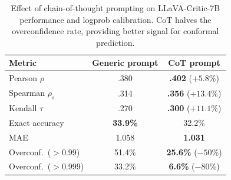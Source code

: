 \documentclass{article}
\begin{document}
\begin{table}[t]
\centering
\caption{Effect of chain-of-thought prompting on LLaVA-Critic-7B performance and logprob calibration. CoT halves the overconfidence rate, providing better signal for conformal prediction.}
\label{tab:cot_effect}
\small
\begin{tabular}{lcc}
\toprule
\textbf{Metric} & \textbf{Generic prompt} & \textbf{CoT prompt} \\
\midrule
Pearson $\rho$ & .380 & \textbf{.402} ($+5.8\%$) \\
Spearman $\rho_s$ & .314 & \textbf{.356} ($+13.4\%$) \\
Kendall $\tau$ & .270 & \textbf{.300} ($+11.1\%$) \\
Exact accuracy & \textbf{33.9\%} & 32.2\% \\
MAE & 1.058 & \textbf{1.031} \\
\midrule
Overconf.\ ($>$0.99) & 51.4\% & \textbf{25.6\%} ($-50\%$) \\
Overconf.\ ($>$0.999) & 33.2\% & \textbf{6.6\%} ($-80\%$) \\
\bottomrule
\end{tabular}
\end{table}



\end{document}

